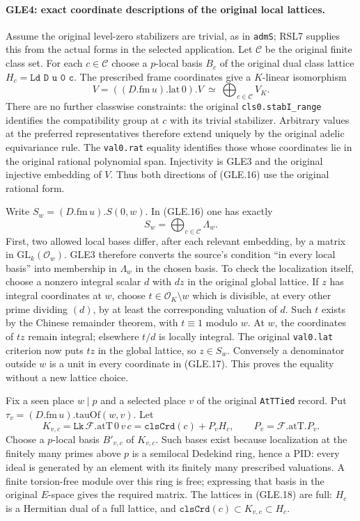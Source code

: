 \paragraph{GLE4: exact coordinate descriptions of the original local lattices.}
\label{claim:GLE4}
Assume the original level-zero stabilizers are trivial, as in
\texttt{admS}; RSL7 supplies this from the actual forms in the selected
application.  Let $\mathcal C$ be the original finite class set.
For each $c\in\mathcal C$ choose a $p$-local basis $B_c$ of the original
dual class lattice
$H_c=\texttt{Ld D u 0 c}$.  The prescribed frame coordinates give a
$K$-linear isomorphism
\[
 V= ((D.\mathrm{fm}\,u).\mathrm{lat}\,0).V
       \ \simeq\ \bigoplus_{c\in\mathcal C}V_K.
 \tag{GLE.16}
\]
There are no further classwise constraints: the original
\texttt{cls0.stabI\_range} identifies the compatibility group at $c$
with its trivial stabilizer.  Arbitrary values at the preferred
representatives therefore extend uniquely by the original adelic
equivariance rule.  The \texttt{val0.rat} equality identifies those
whose coordinates lie in the original rational polynomial span.
Injectivity is GLE3 and the original injective embedding of $V$.
Thus both directions of (GLE.16) use the original rational form.

Write $S_w=(D.\mathrm{fm}\,u).S(0,w)$.  In (GLE.16) one has exactly
\[
                         S_w=\bigoplus_{c\in\mathcal C}\Lambda_w.
 \tag{GLE.17}
\]
First, two allowed local bases differ, after each relevant embedding,
by a matrix in $\mathrm{GL}_k(\mathcal O_w)$.  GLE3 therefore converts
the source's condition ``in every local basis'' into membership in
$\Lambda_w$ in the chosen basis.  To check the localization itself,
choose a nonzero integral scalar $d$ with $d z$ in the original global
lattice.  If $z$ has integral coordinates at $w$, choose
$t\in\mathcal O_K\setminus w$ which is divisible, at every other prime
dividing $(d)$, by at least the corresponding valuation of $d$.
Such $t$ exists by the Chinese remainder theorem, with $t\equiv1$
modulo $w$.  At $w$, the coordinates of $tz$ remain integral; elsewhere
$t/d$ is locally integral.  The original \texttt{val0.lat} criterion
now puts $tz$ in the global lattice, so $z\in S_w$.  Conversely a
denominator outside $w$ is a unit in every coordinate in (GLE.17).
This proves the equality without a new lattice choice.

Fix a seen place $w\mid p$ and a selected place $v$ of the original
\texttt{AtTTied} record.  Put $\tau_v=(D.\mathrm{fm}\,u).\mathrm{tauOf}(w,v)$.
Let
\[
 K_{v,c}=\texttt{Lk}\,\mathcal F.\mathrm{atT}\,0\,v\,c
        =\texttt{clsCrd}(c)+P_vH_c,
 \qquad P_v=\mathcal F.\mathrm{atT}.P_v.
 \tag{GLE.18}
\]
Choose a $p$-local basis $B'_{v,c}$ of $K_{v,c}$.  Such bases exist
because localization at the finitely many primes above $p$ is a
semilocal Dedekind ring, hence a PID: every ideal is generated by an
element with its finitely many prescribed valuations.  A finite
torsion-free module over this ring is free; expressing that basis in
the original $E$-space gives the required matrix.  The lattices in
(GLE.18) are full: $H_c$ is a Hermitian dual of a full lattice, and
$\texttt{clsCrd}(c)\subset K_{v,c}\subset H_c$.

